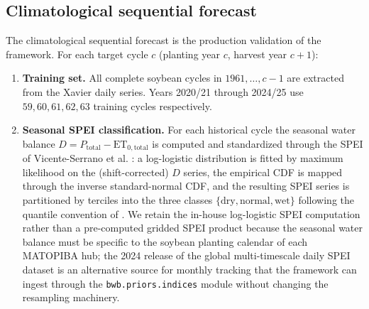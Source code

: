 \documentclass[review,5p,times]{elsarticle}
\begin{document}
\subsection{Climatological sequential forecast}\label{sec:methods_forecast}

The climatological sequential forecast is the production validation
of the framework. For each target cycle $c$
(planting year $c$, harvest year $c+1$):

\begin{enumerate}
\item \textbf{Training set.} All complete soybean cycles in
$1961, \ldots, c-1$ are extracted from the Xavier daily series. Years
2020/21 through 2024/25 use $59, 60, 61, 62, 63$ training cycles
respectively.

\item \textbf{Seasonal SPEI classification.} For each historical cycle
the seasonal water balance $D = P_{\mathrm{total}} - \mathrm{ET}_{0,\mathrm{total}}$
is computed and standardized through the SPEI of Vicente-Serrano et al.
\cite{VicenteSerrano2010}: a log-logistic distribution is fitted by
maximum likelihood on the (shift-corrected) $D$ series, the empirical
CDF is mapped through the inverse standard-normal CDF, and the
resulting SPEI series is partitioned by terciles into the three
classes $\{\text{dry}, \text{normal}, \text{wet}\}$ following the
quantile convention of \cite{Pinkayan1966,Xavier2002}. We retain the
in-house log-logistic SPEI computation rather than a pre-computed
gridded SPEI product because the seasonal water balance must be
specific to the soybean planting calendar of each MATOPIBA hub; the
2024 release of the global multi-timescale daily SPEI dataset
\citep{Wang2024SPEIGD} is an alternative source for monthly tracking
that the framework can ingest through the
\verb|bwb.priors.indices| module without changing the resampling
machinery.


\end{enumerate}
\end{document}
